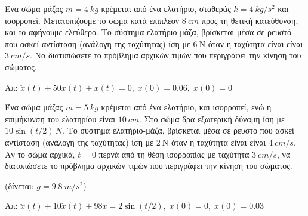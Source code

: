 


\usepackage[RPvoltages]{circuitikz}


\geometry{left=15.63mm,right=15.63mm,top=30.25mm,bottom=33.25mm,
footskip=24.16mm,headsep=24.16mm}

\pagestyle{vangelis}





\begin{center}
  \minibox{\large\bfseries \textcolor{Col1}{Μηχανικές και Ηλεκτρικές ταλαντώσεις}}
\end{center}

\vspace{\baselineskip}

\begin{problem}
  Ένα σώμα μάζας $ m= \SI{4}{kg} $ κρέμεται από ένα ελατήριο, σταθεράς 
  $ k= \SI{4}{kg/s^{2}} $ και ισορροπεί. Μετατοπίζουμε το σώμα κατά 
  επιπλέον $ \SI{8}{cm} $ προς τη θετική κατεύθυνση, και το αφήνουμε ελεύθερο. 
  Το σύστημα ελατήριο-μάζα, βρίσκεται μέσα σε ρευστό που ασκεί αντίσταση (ανάλογη της 
  ταχύτητας) ίση με $ \SI{6}{\newton} $ όταν η ταχύτητα είναι είναι $\SI{3}{cm/s}$. 
  Να διατυπώσετε το πρόβλημα αρχικών τιμών που περιγράφει την κίνηση του σώματος.
\end{problem}

\hfill Απ: $ \ddot{x}(t)+ 50\dot{x}(t)+ x(t)=0, \; x(0)=0.06, \; \dot{x}(0)=0 $ 

\begin{problem}
  Ένα σώμα μάζας $ m= \SI{5}{kg} $ κρέμεται από ένα ελατήριο, και ισορροπεί, ενώ η 
  επιμήκυνση του ελατηρίου είναι $ \SI{10}{cm} $. Στο σώμα δρα εξωτερική δύναμη ίση με 
  $ 10 \sin{(t/2)} \, \si{N} $. Το σύστημα ελατήριο-μάζα, βρίσκεται μέσα σε ρευστό που 
  ασκεί αντίσταση (ανάλογη της ταχύτητας) ίση με $ \SI{2}{\newton} $ όταν η ταχύτητα 
  είναι είναι $\SI{4}{cm/s}$. Αν το σώμα αρχικά, $ t=0 $ περνά από τη θέση 
  ισορροπίας με ταχύτητα $ \SI{3}{cm/s} $, να διατυπώσετε το πρόβλημα αρχικών τιμών 
  που περιγράφει την κίνηση του σώματος.
  
  \hfill (δίνεται: $ g= \SI{9.8}{m/s^{2}} $)
\end{problem}

\hfill Απ: $ \ddot{x}(t)+10 \dot{x}(t)+98x= 2 \sin{(t/2)}, \; x(0)=0, \; 
\dot{x}(0)=0.03 $  

